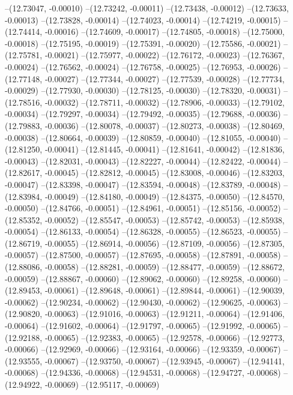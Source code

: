 --(12.73047, -0.00010)
--(12.73242, -0.00011)
--(12.73438, -0.00012)
--(12.73633, -0.00013)
--(12.73828, -0.00014)
--(12.74023, -0.00014)
--(12.74219, -0.00015)
--(12.74414, -0.00016)
--(12.74609, -0.00017)
--(12.74805, -0.00018)
--(12.75000, -0.00018)
--(12.75195, -0.00019)
--(12.75391, -0.00020)
--(12.75586, -0.00021)
--(12.75781, -0.00021)
--(12.75977, -0.00022)
--(12.76172, -0.00023)
--(12.76367, -0.00024)
--(12.76562, -0.00024)
--(12.76758, -0.00025)
--(12.76953, -0.00026)
--(12.77148, -0.00027)
--(12.77344, -0.00027)
--(12.77539, -0.00028)
--(12.77734, -0.00029)
--(12.77930, -0.00030)
--(12.78125, -0.00030)
--(12.78320, -0.00031)
--(12.78516, -0.00032)
--(12.78711, -0.00032)
--(12.78906, -0.00033)
--(12.79102, -0.00034)
--(12.79297, -0.00034)
--(12.79492, -0.00035)
--(12.79688, -0.00036)
--(12.79883, -0.00036)
--(12.80078, -0.00037)
--(12.80273, -0.00038)
--(12.80469, -0.00038)
--(12.80664, -0.00039)
--(12.80859, -0.00040)
--(12.81055, -0.00040)
--(12.81250, -0.00041)
--(12.81445, -0.00041)
--(12.81641, -0.00042)
--(12.81836, -0.00043)
--(12.82031, -0.00043)
--(12.82227, -0.00044)
--(12.82422, -0.00044)
--(12.82617, -0.00045)
--(12.82812, -0.00045)
--(12.83008, -0.00046)
--(12.83203, -0.00047)
--(12.83398, -0.00047)
--(12.83594, -0.00048)
--(12.83789, -0.00048)
--(12.83984, -0.00049)
--(12.84180, -0.00049)
--(12.84375, -0.00050)
--(12.84570, -0.00050)
--(12.84766, -0.00051)
--(12.84961, -0.00051)
--(12.85156, -0.00052)
--(12.85352, -0.00052)
--(12.85547, -0.00053)
--(12.85742, -0.00053)
--(12.85938, -0.00054)
--(12.86133, -0.00054)
--(12.86328, -0.00055)
--(12.86523, -0.00055)
--(12.86719, -0.00055)
--(12.86914, -0.00056)
--(12.87109, -0.00056)
--(12.87305, -0.00057)
--(12.87500, -0.00057)
--(12.87695, -0.00058)
--(12.87891, -0.00058)
--(12.88086, -0.00058)
--(12.88281, -0.00059)
--(12.88477, -0.00059)
--(12.88672, -0.00059)
--(12.88867, -0.00060)
--(12.89062, -0.00060)
--(12.89258, -0.00060)
--(12.89453, -0.00061)
--(12.89648, -0.00061)
--(12.89844, -0.00061)
--(12.90039, -0.00062)
--(12.90234, -0.00062)
--(12.90430, -0.00062)
--(12.90625, -0.00063)
--(12.90820, -0.00063)
--(12.91016, -0.00063)
--(12.91211, -0.00064)
--(12.91406, -0.00064)
--(12.91602, -0.00064)
--(12.91797, -0.00065)
--(12.91992, -0.00065)
--(12.92188, -0.00065)
--(12.92383, -0.00065)
--(12.92578, -0.00066)
--(12.92773, -0.00066)
--(12.92969, -0.00066)
--(12.93164, -0.00066)
--(12.93359, -0.00067)
--(12.93555, -0.00067)
--(12.93750, -0.00067)
--(12.93945, -0.00067)
--(12.94141, -0.00068)
--(12.94336, -0.00068)
--(12.94531, -0.00068)
--(12.94727, -0.00068)
--(12.94922, -0.00069)
--(12.95117, -0.00069)

